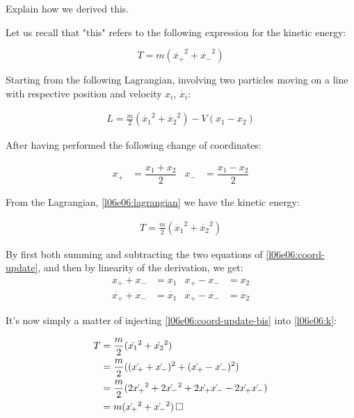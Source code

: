 \documentclass[solutions.tex]{subfiles}
\begin{document}
\maketitle
\begin{exercise}
Explain how we derived this.
\end{exercise}

Let us recall that "this" refers to the following expression for the
kinetic energy:

\[
	T = m (\dot{x_+}^2+\dot{x_-}^2)
\]

Starting from the following Lagrangian, involving two particles
moving on a line with respective position and velocity $x_i$, $\dot{x_i}$:

\begin{align}\label{l06e06:lagrangian}
	L = \frac{m}{2}(\dot{x_1}^2+\dot{x_2}^2)-V(x_1-x_2)
\end{align}

After having performed the following change of coordinates:

\begin{align}
	x_+ &= \dfrac{x_1+x_2}{2} &
	x_- &= \dfrac{x_1-x_2}{2} \label{l06e06:coord-update}
\end{align}

From the Lagrangian, \eqref{l06e06:lagrangian} we have the kinetic energy:

\begin{align}\label{l06e06:k}
	T = \frac{m}{2}(\dot{x_1}^2+\dot{x_2}^2)
\end{align}

By first both summing and subtracting the two equations of
\eqref{l06e06:coord-update}, and then by linearity of the derivation,
we get:
\begin{align}
	x_+ + x_- &= x_1 &
	x_+ - x_- &= x_2 \nonumber \\
	\dot{x_+} + \dot{x_-} &= \dot{x_1} &
	\dot{x_+} - \dot{x_-} &= \dot{x_2} \label{l06e06:coord-update-bis}
\end{align}

It's now simply a matter of injecting \eqref{l06e06:coord-update-bis}
into \eqref{l06e06:k}:

\begin{align*}
	T &= \dfrac{m}{2}(\dot{x_1}^2+\dot{x_2}^2) \\
	~ &= \dfrac{m}{2}((\dot{x_+} + \dot{x_-})^2+(\dot{x_+} - \dot{x_-})^2) \\
	~ &= \dfrac{m}{2}(
		2\dot{x_+}^2 +
		2\dot{x_-}^2 +
		2\dot{x_+}\dot{x_-} - 2\dot{x_+}\dot{x_-}
	) \\
	~ &= m(\dot{x_+}^2 +\dot{x_-}^2) \qed
\end{align*}
\end{document}
